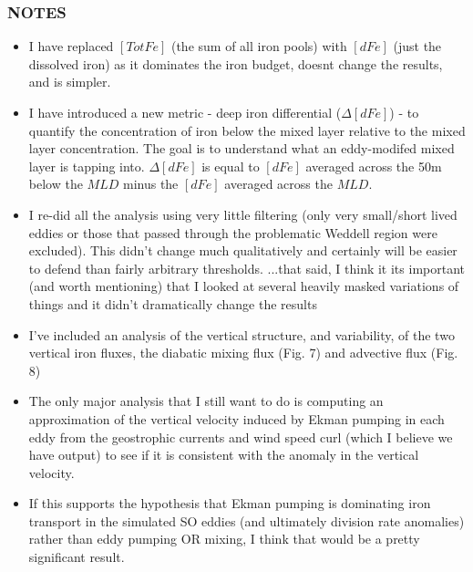 \subsubsection*{NOTES}
\vspace{5mm}
\begin{itemize}
    \item I have replaced $[TotFe]$ (the sum of all iron pools) with $[dFe]$ (just the dissolved iron) as it dominates the iron budget, doesnt change the results, and is simpler.
    \item I have introduced a new metric - deep iron differential ($\Delta[dFe]$) - to quantify the concentration of iron below the mixed layer relative to the mixed layer concentration. The goal is to understand what an eddy-modifed mixed layer is tapping into. $\Delta[dFe]$ is equal to $[dFe]$ averaged across the 50m below the $MLD$ minus the $[dFe]$ averaged across the $MLD$. 
    \item I re-did all the analysis using very little filtering (only very small/short lived eddies or those that passed through the problematic Weddell region were excluded). This didn't change much qualitatively and certainly will be easier to defend than fairly arbitrary thresholds.  ...that said, I think it its important (and worth mentioning) that I looked at several heavily masked variations of things and it didn't dramatically change the results 
    \item I've included an analysis of the vertical structure, and variability, of the two vertical iron fluxes, the diabatic mixing flux (Fig. 7) and advective flux (Fig. 8)
    \item The only major analysis that I still want to do is computing an approximation of the vertical velocity induced by Ekman pumping in each eddy from the geostrophic currents and wind speed curl (which I believe we have output) to see if it is consistent with the anomaly in the vertical velocity. 
    \item If this supports the hypothesis that Ekman pumping is dominating iron transport in the simulated SO eddies (and ultimately division rate anomalies) rather than eddy pumping OR mixing, I think that would be a pretty significant result. 
    
\end{itemize}
\vspace{5mm}






